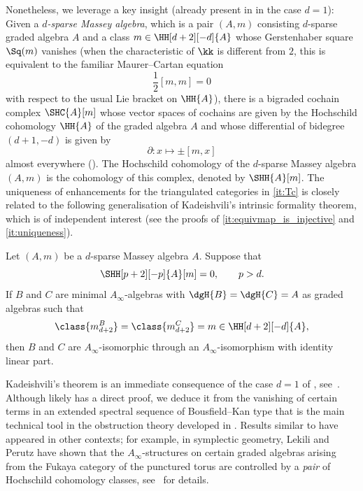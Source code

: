 \documentclass[a4paper]{amsart}
\begin{document}
Nonetheless, we leverage a key insight (already present in
\cite{Mur20b,Mur22} in the case $d=1$): Given a \emph{$d$-sparse Massey
  algebra}, which is a pair $(A,m)$ consisting $d$-sparse graded algebra $A$ and
a class $m\in\HH[d+2][-d]{A}$ whose Gerstenhaber square $\Sq(m)$ vanishes (when
the characteristic of $\kk$ is different from $2$, this is equivalent to the
familiar Maurer--Cartan equation
\[
  \frac{1}{2}[m,m]=0
\]
with respect to the usual Lie bracket on $\HH{A}$), there is a bigraded cochain
complex $\SHC{A}[m]$ whose vector spaces of cochains are given by the Hochschild
cohomology $\HH{A}$ of the graded algebra $A$ and whose differential of bidegree
$(d+1,-d)$ is given by
\[
  \partial\colon x\longmapsto\pm[m,x]
\]
almost everywhere (). The Hochschild cohomology of the
$d$-sparse Massey algebra $(A,m)$ is the cohomology of this complex, denoted by
$\SHH{A}[m]$. The uniqueness of enhancements for the triangulated categories in
\eqref{it:Tc} is closely related to the
following generalisation of Kadeishvili's intrinsic formality theorem, which is
of independent interest (see the proofs of
\eqref{it:equivmap_is_injective} and
\eqref{it:uniqueness}).

\begin{theorem intro}
  \label{thm:secondary_formality}
  Let $(A,m)$ be a $d$-sparse Massey algebra $A$. Suppose that
  \[
    \SHH[p+2][-p]{A}[m]=0,\qquad p>d.
  \]
  If $B$ and $C$ are minimal $A_\infty$-algebras with $\dgH{B}=\dgH{C}=A$ as
  graded algebras such that
  \[
    \class{m_{d+2}^B}=\class{m_{d+2}^C}=m\in\HH[d+2][-d]{A},
  \]
  then $B$ and $C$ are $A_\infty$-isomorphic through an $A_\infty$-isomorphism with identity linear part.
\end{theorem intro}

Kadeishvili's theorem is an immediate consequence of the case $d=1$ of
, see~. Although  likely has a direct proof, we deduce it
from the vanishing of certain terms in an extended spectral sequence of Bousfield--Kan
type that is the main technical tool in the obstruction theory developed in
\cite{Mur20b}. Results similar to  have appeared
in other contexts; for example, in symplectic geometry, Lekili and Perutz have shown that the
$A_\infty$-structures on certain graded algebras arising from the Fukaya category of the
punctured torus are controlled by a \emph{pair} of Hochschild cohomology
classes, see~\cite{LP11} for details.
\end{document}
